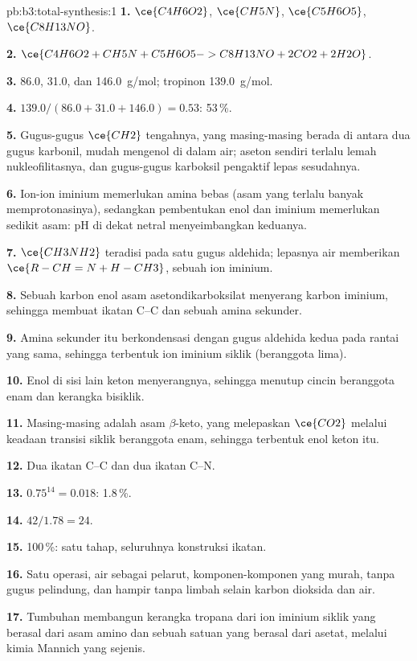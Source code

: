 \begin{solution}{pb:b3:total-synthesis:1}
\textbf{1.} $\ce{C4H6O2}$, $\ce{CH5N}$, $\ce{C5H6O5}$, $\ce{C8H13NO}$.

\textbf{2.} $\ce{C4H6O2 + CH5N + C5H6O5 -> C8H13NO + 2CO2 + 2H2O}$.

\textbf{3.} 86.0, 31.0, dan \qty{146.0}{g/mol}; tropinon \qty{139.0}{g/mol}.

\textbf{4.} $139.0/(86.0 + 31.0 + 146.0) = 0.53$: 53\,\%.

\textbf{5.} Gugus-gugus $\ce{CH2}$ tengahnya, yang masing-masing berada di antara dua gugus karbonil, mudah mengenol di dalam
air; aseton sendiri terlalu lemah nukleofilitasnya, dan gugus-gugus karboksil pengaktif
lepas sesudahnya.

\textbf{6.} Ion-ion iminium memerlukan amina bebas (asam yang terlalu banyak memprotonasinya), sedangkan
pembentukan enol dan iminium memerlukan sedikit asam: pH di dekat netral menyeimbangkan keduanya.

\textbf{7.} $\ce{CH3NH2}$ teradisi pada satu gugus aldehida; lepasnya air memberikan
$\ce{R-CH=N+H-CH3}$, sebuah ion iminium.

\textbf{8.} Sebuah karbon enol asam asetondikarboksilat menyerang karbon iminium, sehingga membuat
ikatan C--C dan sebuah amina sekunder.

\textbf{9.} Amina sekunder itu berkondensasi dengan gugus aldehida kedua pada rantai
yang sama, sehingga terbentuk ion iminium siklik (beranggota lima).

\textbf{10.} Enol di sisi lain keton menyerangnya, sehingga menutup
cincin beranggota enam dan kerangka bisiklik.

\textbf{11.} Masing-masing adalah asam $\beta$-keto, yang melepaskan $\ce{CO2}$ melalui keadaan transisi siklik beranggota enam,
sehingga terbentuk enol keton itu.

\textbf{12.} Dua ikatan C--C dan dua ikatan C--N.

\textbf{13.} $0.75^{14} = 0.018$: 1.8\,\%.

\textbf{14.} $42/1.78 = 24$.

\textbf{15.} 100\,\%: satu tahap, seluruhnya konstruksi ikatan.

\textbf{16.} Satu operasi, air sebagai pelarut, komponen-komponen yang murah, tanpa gugus pelindung, dan
hampir tanpa limbah selain karbon dioksida dan air.

\textbf{17.} Tumbuhan membangun kerangka tropana dari ion iminium siklik yang berasal dari asam amino
dan sebuah satuan yang berasal dari asetat, melalui kimia Mannich
yang sejenis.


\end{solution}
